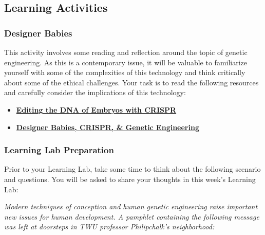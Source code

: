 \documentclass[
]{book}
\providecommand{\tightlist}{%
  \setlength{\itemsep}{0pt}\setlength{\parskip}{0pt}}
\begin{document}
\hypertarget{learning-activities-2}{%
\subsection*{Learning Activities}\label{learning-activities-2}}

\hypertarget{designer-babies-1}{%
\subsubsection{Designer Babies}\label{designer-babies-1}}

This activity involves some reading and reflection around the topic of genetic engineering. As this is a contemporary issue, it will be valuable to familiarize yourself with some of the complexities of this technology and think critically about some of the ethical challenges. Your task is to read the following resources and carefully consider the implications of this technology:

\begin{itemize}
\tightlist
\item
  \href{https://www.statnews.com/2019/09/16/could-editing-the-dna-of-embryos-with-crispr-help-save-people-who-are-already-alive/}{\textbf{Editing the DNA of Embryos with CRISPR}}\\
\item
  \href{https://www.geneticsandsociety.org/internal-content/designer-babies-crispr-genetic-engineering}{\textbf{Designer Babies, CRISPR, \& Genetic Engineering}}
\end{itemize}

\hypertarget{learning-lab-preparation-7}{%
\subsubsection*{Learning Lab Preparation}\label{learning-lab-preparation-7}}

Prior to your Learning Lab, take some time to think about the following scenario and questions. You will be asked to share your thoughts in this week's Learning Lab:

\emph{Modern techniques of conception and human genetic engineer­ing raise important new issues for human development. A pam­phlet containing the following message was left at doorsteps in TWU professor Philipchalk's neighborhood:}
\end{document}
